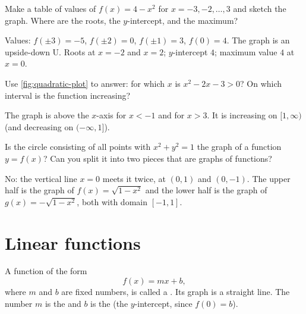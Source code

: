 \sectionexercises

\begin{exercise}
Make a table of values of $f(x) = 4 - x^2$ for $x = -3, -2, \dots, 3$ and
sketch the graph. Where are the roots, the $y$-intercept, and the maximum?
\end{exercise}
\begin{solution}
Values: $f(\pm3) = -5$, $f(\pm2) = 0$, $f(\pm1) = 3$, $f(0) = 4$. The graph is
an upside-down U. Roots at $x = -2$ and $x = 2$; $y$-intercept $4$; maximum
value $4$ at $x = 0$.
\end{solution}

\begin{exercise}
Use \cref{fig:quadratic-plot} to answer: for which $x$ is
$x^2 - 2x - 3 > 0$? On which interval is the function increasing?
\end{exercise}
\begin{solution}
The graph is above the $x$-axis for $x < -1$ and for $x > 3$. It is
increasing on $[1, \infty)$ (and decreasing on $(-\infty, 1]$).
\end{solution}

\begin{exercise}
Is the circle consisting of all points with $x^2 + y^2 = 1$ the graph of a
function $y = f(x)$? Can you split it into two pieces that are graphs of
functions?
\end{exercise}
\begin{solution}
No: the vertical line $x = 0$ meets it twice, at $(0, 1)$ and $(0, -1)$. The
upper half is the graph of $f(x) = \sqrt{1 - x^2}$ and the lower half is the
graph of $g(x) = -\sqrt{1 - x^2}$, both with domain $[-1, 1]$.
\end{solution}

\section{Linear functions}\label{sec:linear-functions}

\begin{definition}\label{def:linear-function}
A function of the form
\[
  f(x) = mx + b ,
\]
where $m$ and $b$ are fixed numbers, is called a . Its
graph is a straight line. The number $m$ is the  and $b$ is the
 (the $y$-intercept, since $f(0) = b$).
\end{definition}

